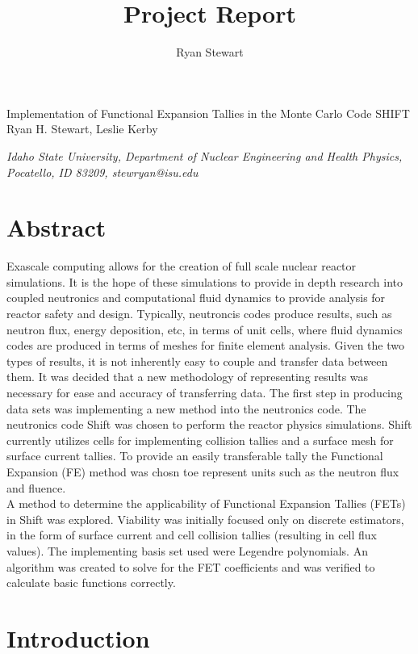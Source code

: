\documentclass[10tma4paper]{article}
\title{Project Report}
\author{Ryan Stewart}
\begin{document}
	\begin{center}
		Implementation of Functional Expansion Tallies in the 
		Monte Carlo Code SHIFT
		\\
		\bigskip
		\small{Ryan H. Stewart, Leslie} Kerby
		\\
	\end{center}
	
	\begin{center}
		\textit{\small{Idaho State University, Department of Nuclear Engineering and Health Physics, Pocatello, ID 83209, stewryan@isu.edu}}
	\end{center}
	

\section{Abstract}\label{abstract}

Exascale computing allows for the creation of full scale nuclear reactor simulations. It is the hope of these simulations to provide in depth research into coupled neutronics and computational fluid dynamics to provide analysis for reactor safety and design. Typically, neutroncis codes produce results, such as neutron flux, energy deposition, etc, in terms of unit cells, where fluid dynamics codes are produced in terms of meshes for finite element analysis. Given the two types of results, it is not inherently easy to couple and transfer data between them. It was decided that a new methodology of representing results was necessary for ease and accuracy of transferring data. The first step in producing data sets was implementing a new method into the neutronics code. The neutronics code Shift was chosen to perform the reactor physics simulations. Shift currently utilizes cells for implementing collision tallies and a surface mesh for surface current tallies. To provide an easily transferable tally the Functional Expansion (FE) method was chosn toe represent units such as the neutron flux and fluence. 
\\A method to determine the applicability of Functional Expansion Tallies (FETs) in Shift was explored. Viability was initially focused only on discrete estimators, in the form of surface current and cell collision tallies (resulting in cell flux values). The implementing basis set used were Legendre polynomials. An algorithm was created to solve for the FET coefficients and was verified to calculate basic functions correctly.

\section{Introduction}\label{intro}
\end{document}
